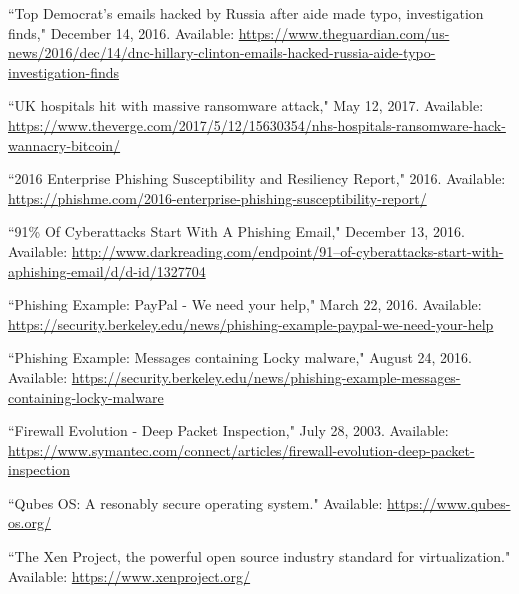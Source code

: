 % 
% 

\begin{thebibliography}{99}
\begin{singlespace}
\raggedright

``Top Democrat's emails hacked by Russia after aide made typo, investigation finds," December 14, 2016. Available: \url{https://www.theguardian.com/us-news/2016/dec/14/dnc-hillary-clinton-emails-hacked-russia-aide-typo-investigation-finds}

``UK hospitals hit with massive ransomware attack," May 12, 2017. Available: \url{https://www.theverge.com/2017/5/12/15630354/nhs-hospitals-ransomware-hack-wannacry-bitcoin/}

``2016 Enterprise Phishing Susceptibility and Resiliency Report," 2016. Available: \url{https://phishme.com/2016-enterprise-phishing-susceptibility-report/}

``91\% Of Cyberattacks Start With A Phishing Email," December 13, 2016. Available: \url{http://www.darkreading.com/endpoint/91–of-cyberattacks-start-with-aphishing-email/d/d-id/1327704}

``Phishing Example: PayPal - We need your help," March 22, 2016. Available: \url{https://security.berkeley.edu/news/phishing-example-paypal-we-need-your-help}

``Phishing Example: Messages containing Locky malware," August 24, 2016. Available: 
\url{https://security.berkeley.edu/news/phishing-example-messages-containing-locky-malware}

``Firewall Evolution - Deep Packet Inspection," July 28, 2003. Available: \url{https://www.symantec.com/connect/articles/firewall-evolution-deep-packet-inspection}

``Qubes OS: A resonably secure operating system." Available: \url{https://www.qubes-os.org/}

``The Xen Project, the powerful open source industry standard for virtualization." Available: \url{https://www.xenproject.org/}


\end{singlespace}
\end{thebibliography}
